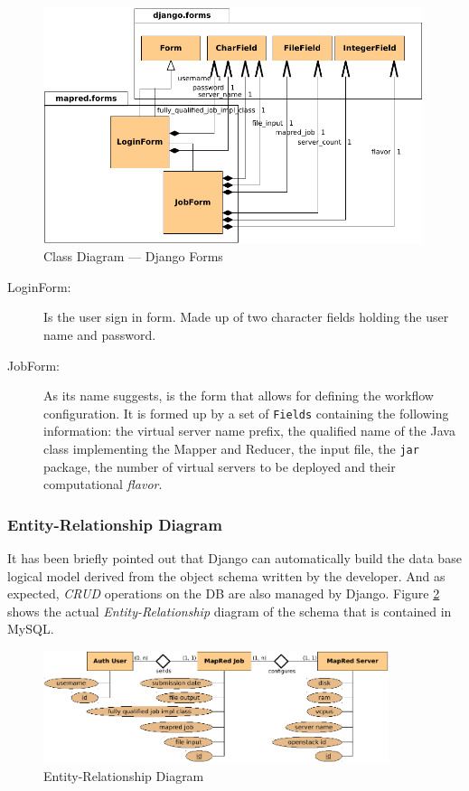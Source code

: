\begin{figure}[tbp]
\begin{center}
\includegraphics[width=0.99\textwidth]{imagenes/031.pdf}
 \caption{Class Diagram --- Django Forms}
\label{fig:clasesformulariosdjango}
\end{center}
\end{figure}

\begin{description}
 \item[LoginForm:] Is the user sign in form. Made up of two character fields holding the user name and password.
 \item[JobForm:] As its name suggests, is the form that allows for defining the workflow configuration. It is formed up by a set of \texttt{Fields} containing the following information: the virtual server name prefix, the qualified name of the Java class implementing the Mapper and Reducer, the input file, the \texttt{jar} package, the number of virtual servers to be deployed and their computational \emph{flavor}.
\end{description}


\subsubsection{Entity-Relationship Diagram}\label{subsubsec:entidadrelacion}
\noindent It has been briefly pointed out that Django can automatically build the data base logical model derived from the object schema written by the developer. And as expected, \emph{CRUD} operations on the DB are also managed by Django. Figure \ref{fig:entidadrelacion} shows the actual \emph{Entity-Relationship} diagram of the schema that is contained in MySQL.

\begin{figure}[tbp]
\begin{center}
\includegraphics[width=0.9\textwidth]{imagenes/032.pdf}
 \caption{Entity-Relationship Diagram}
\label{fig:entidadrelacion}
\end{center}
\end{figure}

